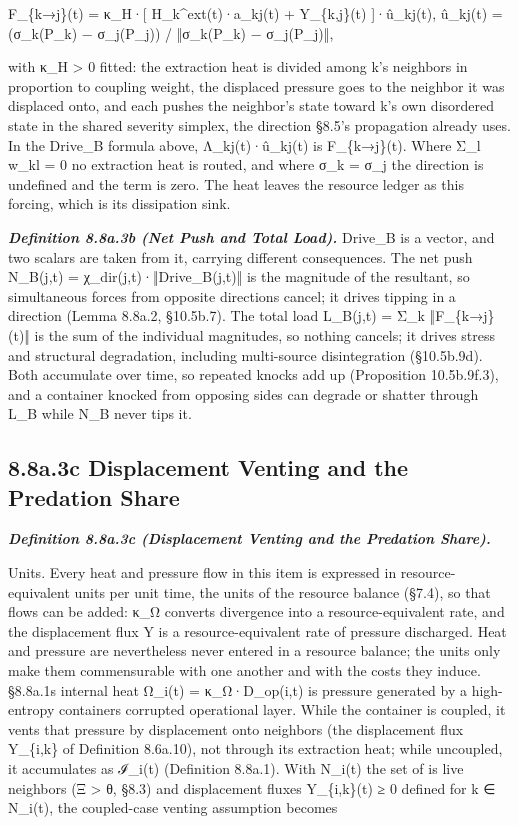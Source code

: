 \documentclass[
]{article}
\begin{document}
F\_\{k→j\}(t) = κ\_H·{[} H\_k\^{}ext(t)·a\_kj(t) + Y\_\{k,j\}(t)
{]}·û\_kj(t), û\_kj(t) = (σ\_k(P\_k) − σ\_j(P\_j)) / ‖σ\_k(P\_k) −
σ\_j(P\_j)‖,

with κ\_H \textgreater{} 0 fitted: the extraction heat is divided among
k's neighbors in proportion to coupling weight, the displaced pressure
goes to the neighbor it was displaced onto, and each pushes the
neighbor's state toward k's own disordered state in the shared severity
simplex, the direction §8.5's propagation already uses. In the Drive\_B
formula above, Λ\_kj(t)·û\_kj(t) is F\_\{k→j\}(t). Where Σ\_l w\_kl = 0
no extraction heat is routed, and where σ\_k = σ\_j the direction is
undefined and the term is zero. The heat leaves the resource ledger as
this forcing, which is its dissipation sink.

\emph{\textbf{Definition 8.8a.3b (Net Push and Total Load).}} Drive\_B
is a vector, and two scalars are taken from it, carrying different
consequences. The net push N\_B(j,t) = χ\_dir(j,t)·‖Drive\_B(j,t)‖ is
the magnitude of the resultant, so simultaneous forces from opposite
directions cancel; it drives tipping in a direction (Lemma 8.8a.2,
§10.5b.7). The total load L\_B(j,t) = Σ\_k ‖F\_\{k→j\}(t)‖ is the sum of
the individual magnitudes, so nothing cancels; it drives stress and
structural degradation, including multi-source disintegration
(§10.5b.9d). Both accumulate over time, so repeated knocks add up
(Proposition 10.5b.9f.3), and a container knocked from opposing sides
can degrade or shatter through L\_B while N\_B never tips it.

\hypertarget{a.3c-displacement-venting-and-the-predation-share}{%
\subsection{8.8a.3c Displacement Venting and the Predation
Share}\label{a.3c-displacement-venting-and-the-predation-share}}

\emph{\textbf{Definition 8.8a.3c (Displacement Venting and the Predation
Share).}}

Units. Every heat and pressure flow in this item is expressed in
resource-equivalent units per unit time, the units of the resource
balance (§7.4), so that flows can be added: κ\_Ω converts divergence
into a resource-equivalent rate, and the displacement flux Y is a
resource-equivalent rate of pressure discharged. Heat and pressure are
nevertheless never entered in a resource balance; the units only make
them commensurable with one another and with the costs they induce.
§8.8a.1\textquotesingle s internal heat Ω\_i(t) = κ\_Ω·D\_op(i,t) is
pressure generated by a high-entropy container\textquotesingle s
corrupted operational layer. While the container is coupled, it vents
that pressure by displacement onto neighbors (the displacement flux
Y\_\{i,k\} of Definition 8.6a.10), not through its extraction heat;
while uncoupled, it accumulates as ℐ\_i(t) (Definition 8.8a.1). With
N\_i(t) the set of i\textquotesingle s live neighbors (Ξ \textgreater{}
θ, §8.3) and displacement fluxes Y\_\{i,k\}(t) ≥ 0 defined for k ∈
N\_i(t), the coupled-case venting assumption becomes
\end{document}
